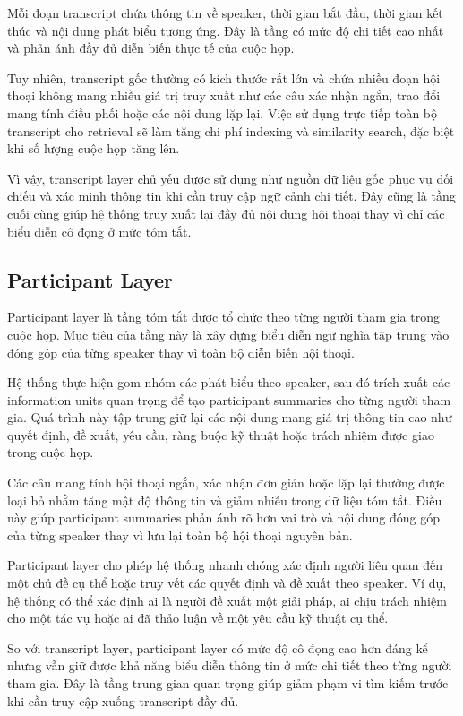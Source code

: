 Mỗi đoạn transcript chứa thông tin về speaker, thời gian bắt đầu, thời gian kết thúc và nội dung phát biểu tương ứng. Đây là tầng có mức độ chi tiết cao nhất và phản ánh đầy đủ diễn biến thực tế của cuộc họp.

Tuy nhiên, transcript gốc thường có kích thước rất lớn và chứa nhiều đoạn hội thoại không mang nhiều giá trị truy xuất như các câu xác nhận ngắn, trao đổi mang tính điều phối hoặc các nội dung lặp lại. Việc sử dụng trực tiếp toàn bộ transcript cho retrieval sẽ làm tăng chi phí indexing và similarity search, đặc biệt khi số lượng cuộc họp tăng lên.

Vì vậy, transcript layer chủ yếu được sử dụng như nguồn dữ liệu gốc phục vụ đối chiếu và xác minh thông tin khi cần truy cập ngữ cảnh chi tiết. Đây cũng là tầng cuối cùng giúp hệ thống truy xuất lại đầy đủ nội dung hội thoại thay vì chỉ các biểu diễn cô đọng ở mức tóm tắt.

\subsection{Participant Layer}

Participant layer là tầng tóm tắt được tổ chức theo từng người tham gia trong cuộc họp. Mục tiêu của tầng này là xây dựng biểu diễn ngữ nghĩa tập trung vào đóng góp của từng speaker thay vì toàn bộ diễn biến hội thoại.

Hệ thống thực hiện gom nhóm các phát biểu theo speaker, sau đó trích xuất các information units quan trọng để tạo participant summaries cho từng người tham gia. Quá trình này tập trung giữ lại các nội dung mang giá trị thông tin cao như quyết định, đề xuất, yêu cầu, ràng buộc kỹ thuật hoặc trách nhiệm được giao trong cuộc họp.

Các câu mang tính hội thoại ngắn, xác nhận đơn giản hoặc lặp lại thường được loại bỏ nhằm tăng mật độ thông tin và giảm nhiễu trong dữ liệu tóm tắt. Điều này giúp participant summaries phản ánh rõ hơn vai trò và nội dung đóng góp của từng speaker thay vì lưu lại toàn bộ hội thoại nguyên bản.

Participant layer cho phép hệ thống nhanh chóng xác định người liên quan đến một chủ đề cụ thể hoặc truy vết các quyết định và đề xuất theo speaker. Ví dụ, hệ thống có thể xác định ai là người đề xuất một giải pháp, ai chịu trách nhiệm cho một tác vụ hoặc ai đã thảo luận về một yêu cầu kỹ thuật cụ thể.

So với transcript layer, participant layer có mức độ cô đọng cao hơn đáng kể nhưng vẫn giữ được khả năng biểu diễn thông tin ở mức chi tiết theo từng người tham gia. Đây là tầng trung gian quan trọng giúp giảm phạm vi tìm kiếm trước khi cần truy cập xuống transcript đầy đủ.

